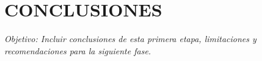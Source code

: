 \chapter*{\center \Large CONCLUSIONES} 

\noindent \textit{Objetivo:  Incluir conclusiones de esta primera etapa, limitaciones y recomendaciones para la siguiente fase.}

